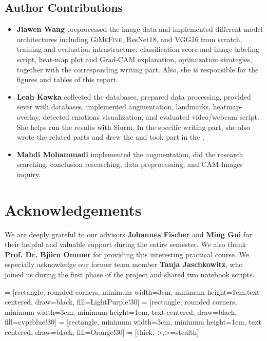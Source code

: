 \subsection*{Author Contributions}
\label{sec:author}

\begin{itemize}
  \item \textbf{Jiawen Wang} preprocessed the image data 
  and implemented different model architectures including \textsc{GiMeFive}, ResNet18, and VGG16 from scratch, 
  training and evaluation infrastructure, classification score and image labeling script, 
  heat-map plot and Grad-CAM explanation, optimization strategies, 
  together with the corresponding writing part. 
  Also, she is responsible for the figures and tables of this report.
  \item \textbf{Leah Kawka} collected the databases, prepared data processing, provided sever with databases, 
  implemented augmentation, landmarks, heatmap-overlay, detected emotions visualization, 
  and evaluated video/webcam script. 
  She helps run the results with Slurm. 
  In the specific writing part, 
  she also wrote the related parts and drew the  and took part in the .
  \item \textbf{Mahdi Mohammadi} implemented the augmentation, did the research searching, conclusion researching, data preprocessing, and CAM-Images inquiry.
\end{itemize}

\section*{Acknowledgements}

We are deeply grateful to our advisors \textbf{Johannes Fischer} and \textbf{Ming Gui} for their helpful and valuable support during the entire semester. 
We also thank \textbf{Prof. Dr. Björn Ommer} for providing this interesting practical course. 
We especially acknowledge our former team member \textbf{Tanja Jaschkowitz}, 
who joined us during the first phase of the project and shared two notebook scripts.


 = [rectangle, rounded corners, minimum width=3cm, minimum height=1cm,text centered, draw=black, fill=LightPurple!30]
 = [rectangle, rounded corners, minimum width=3cm, minimum height=1cm, text centered, draw=black, fill=cvprblue!30]
 = [rectangle, minimum width=3cm, minimum height=1cm, text centered, draw=black, fill=Orange!30]
 = [thick,->,>=stealth]

